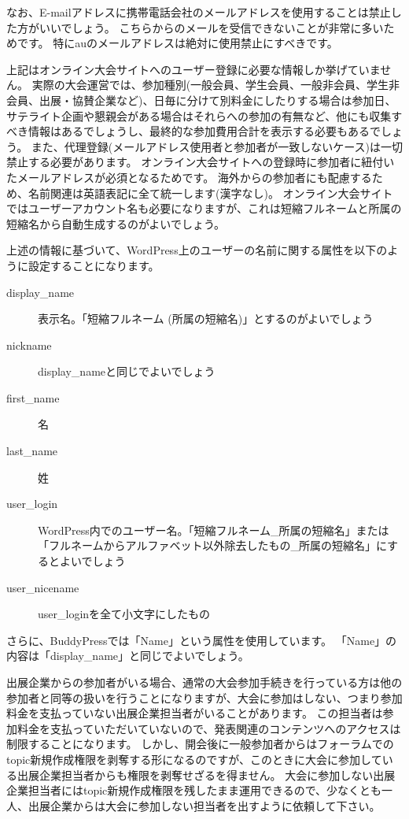 \documentclass[titlepage,10pt,a4paper,uplatex]{jsbook}
\begin{document}
なお、E-mailアドレスに携帯電話会社のメールアドレスを使用することは禁止した方がいいでしょう。
こちらからのメールを受信できないことが非常に多いためです。
特にauのメールアドレスは絶対に使用禁止にすべきです。

上記はオンライン大会サイトへのユーザー登録に必要な情報しか挙げていません。
実際の大会運営では、参加種別(一般会員、学生会員、一般非会員、学生非会員、出展・協賛企業など)、日毎に分けて別料金にしたりする場合は参加日、サテライト企画や懇親会がある場合はそれらへの参加の有無など、他にも収集すべき情報はあるでしょうし、最終的な参加費用合計を表示する必要もあるでしょう。
また、代理登録(メールアドレス使用者と参加者が一致しないケース)は一切禁止する必要があります。
オンライン大会サイトへの登録時に参加者に紐付いたメールアドレスが必須となるためです。
海外からの参加者にも配慮するため、名前関連は英語表記に全て統一します(漢字なし)。
オンライン大会サイトではユーザーアカウント名も必要になりますが、これは短縮フルネームと所属の短縮名から自動生成するのがよいでしょう。

上述の情報に基づいて、WordPress上のユーザーの名前に関する属性を以下のように設定することになります。

\begin{description}
\item[display\_name] 表示名。「短縮フルネーム (所属の短縮名)」とするのがよいでしょう
\item[nickname] display\_nameと同じでよいでしょう
\item[first\_name] 名
\item[last\_name] 姓
\item[user\_login] WordPress内でのユーザー名。「短縮フルネーム\_所属の短縮名」または「フルネームからアルファベット以外除去したもの\_所属の短縮名」にするとよいでしょう
\item[user\_nicename] user\_loginを全て小文字にしたもの
\end{description}

さらに、BuddyPressでは「Name」という属性を使用しています。
「Name」の内容は「display\_name」と同じでよいでしょう。

出展企業からの参加者がいる場合、通常の大会参加手続きを行っている方は他の参加者と同等の扱いを行うことになりますが、大会に参加はしない、つまり参加料金を支払っていない出展企業担当者がいることがあります。
この担当者は参加料金を支払っていただいていないので、発表関連のコンテンツへのアクセスは制限することになります。
しかし、開会後に一般参加者からはフォーラムでのtopic新規作成権限を剥奪する形になるのですが、このときに大会に参加している出展企業担当者からも権限を剥奪せざるを得ません。
大会に参加しない出展企業担当者にはtopic新規作成権限を残したまま運用できるので、少なくとも一人、出展企業からは大会に参加しない担当者を出すように依頼して下さい。
\end{document}
